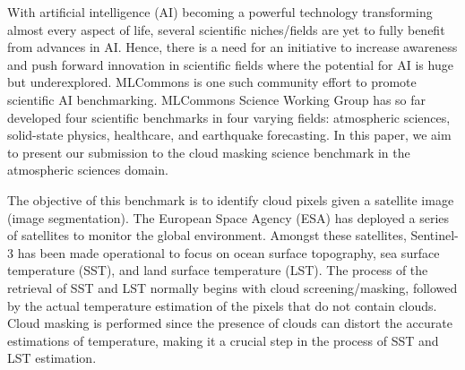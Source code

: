 \documentclass[sigplan,screen]{acmart}
\begin{document}
\nocite{las-2023-ai-workflow} %

With artificial intelligence (AI) becoming a powerful technology transforming almost every aspect of life, several scientific niches/fields are yet to fully benefit from advances in AI. Hence, there is a need for an initiative to increase awareness and push forward innovation in scientific fields where the potential for AI is huge but underexplored. 
MLCommons \cite{www-mlcommons-research}  is one such community effort to promote scientific AI benchmarking. MLCommons Science Working Group \cite{Thiyagalingam2022AIBF} has so far developed four scientific benchmarks in four varying fields: atmospheric sciences, solid-state physics, healthcare, and earthquake forecasting. In this paper, we aim to present our submission to the cloud masking science benchmark in the atmospheric sciences domain. 

The objective of this benchmark \cite{Thiyagalingam2022AIBF} is to identify cloud pixels given a satellite image (image segmentation). The European Space Agency (ESA) \cite{www-sentinel92} has deployed a series of satellites to monitor the global environment. Amongst these satellites, Sentinel-3 has been made operational to focus on ocean surface topography, sea surface temperature (SST), and land surface temperature (LST). The process of the retrieval of SST and LST normally begins with cloud screening/masking, followed by the actual temperature estimation of the pixels that do not contain clouds. Cloud masking is performed since the presence of clouds can distort the accurate estimations of temperature, making it a crucial step in the process of SST and LST estimation. 




\end{document}
